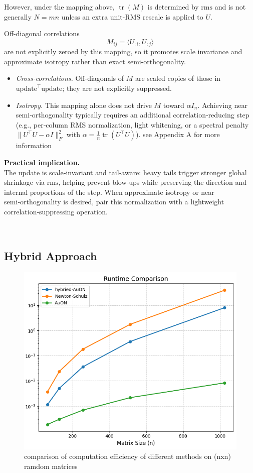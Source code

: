 \documentclass[12pt,a4paper]{article}
\begin{document}
However, under the mapping above, $\operatorname{tr}(M)$ is determined by $\mathrm{rms}$ and is not generally $N = mn$ unless an extra unit-RMS rescale is applied to $U$.  

Off-diagonal correlations 
\[
M_{ij} = \langle U_{:i}, U_{:j} \rangle
\]
are not explicitly zeroed by this mapping, so it promotes scale invariance and approximate isotropy rather than exact semi-orthogonality.
\begin{itemize}
\item \emph{Cross‑correlations.} Off‑diagonals of \(M\) are scaled copies of those in \(\mathrm{update}^\top \mathrm{update}\); they are not explicitly suppressed.
\item \emph{Isotropy.} This mapping alone does not drive \(M\) toward \(\alpha I_n\). Achieving near semi‑orthogonality typically requires an additional correlation‑reducing step (e.g., per‑column RMS normalization, light whitening, or a spectral penalty \(\|U^\top U - \alpha I\|_F^2\) with \(\alpha=\tfrac{1}{n}\operatorname{tr}(U^\top U)\)). see Appendix A for more information
\end{itemize}

\noindent\textbf{Practical implication.}\\
The update is scale‑invariant and tail‑aware: heavy tails trigger stronger global shrinkage via \(\mathrm{rms}\), helping prevent blow‑ups while preserving the direction and internal proportions of the step. When approximate isotropy or near semi‑orthogonality is desired, pair this normalization with a lightweight correlation‑suppressing operation.




⁡\subsection{Hybrid Approach}
\begin{figure}[!htb]
    \vspace*{\fill}
    \centering
    \includegraphics[width=0.5\linewidth]{auon2.png}
   \caption{comparison of computation efficiency of different methods on (nxn) ramdom matrices}
    \label{fig:training_curves}
    \vspace*{\fill}
\end{figure}
\end{document}
